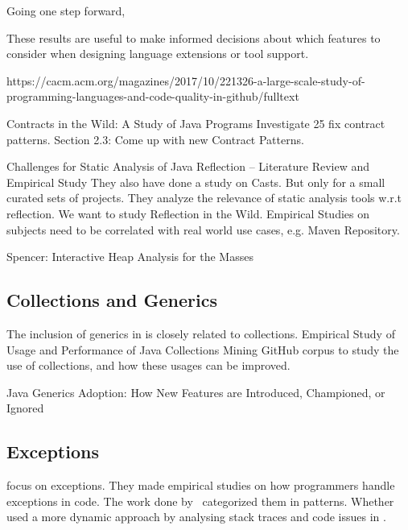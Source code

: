Going one step forward, \cite{ray_large-scale_2017} 

These results are useful to make informed decisions about which features to consider when designing language extensions or tool support.

https://cacm.acm.org/magazines/2017/10/221326-a-large-scale-study-of-programming-languages-and-code-quality-in-github/fulltext



Contracts in the Wild: A Study of Java Programs
Investigate 25 fix contract patterns.
Section 2.3: Come up with new Contract Patterns.
\cite{dietrich_contracts_2017,dietrich_contracts_2017-1}

\cite{landman_challenges_2017}
Challenges for Static Analysis of Java Reflection -- Literature Review and Empirical Study
They also have done a study on Casts.
But only for a small curated sets of projects.
They analyze the relevance of static analysis tools w.r.t reflection.
We want to study Reflection in the Wild.
Empirical Studies on subjects need to be correlated with real world use cases, e.g. Maven Repository.



Spencer: Interactive Heap Analysis for the Masses
\cite{brandauer_spencer:_2017}


\subsection*{Collections and Generics}

The inclusion of generics in \java{} is closely related to collections.
Empirical Study of Usage and Performance of Java Collections
Mining GitHub corpus to study the use of collections, and how these usages can be improved.
\cite{costa_empirical_2017}

Java Generics Adoption: How New Features are Introduced, Championed, or Ignored~\cite{parnin_java_2011,parnin_adoption_2013}


\subsection*{Exceptions}

\cite{kery_examining_2016,asaduzzaman_how_2016} focus on exceptions.
They made empirical studies on how programmers handle exceptions in \java{} code.
The work done by~\cite{nakshatri_analysis_2016} categorized them in patterns.
Whether~\cite{coelho_unveiling_2015} used a more dynamic approach by analysing stack traces and code issues in \github{}.

